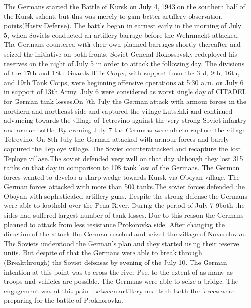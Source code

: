 \documentclass[]{article}
\begin{document}
The Germans started the Battle of Kursk on July 4, 1943 on the southern half of the Kursk salient, but this was merely to gain better artillery observation points(\Gls{Hasty Defense}). The battle began in earnest early in the morning of July 5, when Soviets conducted an artillery barrage before the 
Wehrmacht attacked. The Germans countered with their own planned barrages shortly thereafter 
and seized the initiative on both fronts. Soviet General Rokossovsky redeployed his reserves on 
the night of July 5 in order to attack the following day. The divisions of the 17th and 18th Guards 
Rifle Corps, with support from the 3rd, 9th, 16th, and 19th Tank Corps, were beginning offensive operations at 5:30 a.m. on July 6 in support of 13th Army. July 6 were considered as worst single day of CITADEL for German tank losses.On 7th July the German attack with armour forces in the northern and northeast side and captured the village Lutschki and continued advancing towards the village of Tetrevino against the very strong Soviet infantry and armor battle. By evening July 7 the Germans were ableto capture the village Tetrevino. On 8th July the German attacked with armour forces and barely captured the Teploye village. The Soviet counterattacked and recapture the lost Teploye village.The soviet defended very well on that day although they lost 315 tanks on that day in comparison to 108 tank loss of the Germans. The German forces wanted to develop a sharp wedge towards Kursk via Oboyan village. The German forces attacked with more than 500 tanks.The soviet forces defended the Oboyan with sophisticated artillery guns. Despite the strong defense the Germans were able to foothold over the Pena River. During the period of July 7-9both the sides had suffered largest number of tank losses. Due to this reason the Germans planned to attack from less resistance Prokorovka side. After changing the direction of the attack the German reached and seized the village of Novoselovka. The Soviets understood the German's plan and they started using their reserve units. But despite of that the Germans were able to break through (\Gls{Breakthrough}) the Soviet defenses by evening of the July 10. The German intention at this point was to cross the river Psel to the extent of as many as troops and vehicles are possible. The Germans were able to seize a bridge. The engagement was at this point between artillery and tank.Both the forces were preparing for the battle of Prokhorovka. \\
\end{document}
